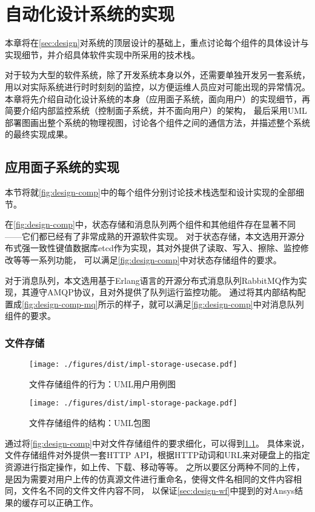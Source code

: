 \documentclass[index]{subfiles}
\begin{document}
\chapter{自动化设计系统的实现}\label{sec:impl}
本章将在\cref{sec:design}对系统的顶层设计的基础上，重点讨论每个组件的具体设计与实现细节，并介绍具体软件实现中所采用的技术栈。

对于较为大型的软件系统，除了开发系统本身以外，还需要单独开发另一套系统，用以对实际系统进行时时刻刻的监控，以方便运维人员应对可能出现的异常情况。
本章将先介绍自动化设计系统的本身（应用面子系统，面向用户）的实现细节，再简要介绍内部监控系统（控制面子系统，并不面向用户）的架构，
最后采用UML部署图画出整个系统的物理视图，讨论各个组件之间的通信方法，并描述整个系统的最终实现成果。

\section{应用面子系统的实现}
本节将就\cref{fig:design-comp}中的每个组件分别讨论技术栈选型和设计实现的全部细节。

在\cref{fig:design-comp}中，状态存储和消息队列两个组件和其他组件存在显著不同——它们都已经有了非常成熟的开源软件实现。
对于状态存储，本文选用开源分布式强一致性键值数据库etcd作为实现，其对外提供了读取、写入、擦除、监控修改等等一系列功能，
可以满足\cref{fig:design-comp}中对状态存储组件的要求。

对于消息队列，本文选用基于Erlang语言的开源分布式消息队列RabbitMQ作为实现，其遵守AMQP协议，且对外提供了队列运行监控功能。
通过将其内部结构配置成\cref{fig:design-comp-mq}所示的样子，就可以满足\cref{fig:design-comp}中对消息队列组件的要求。

\subsection{文件存储}
\begin{figure}[h]
  \centering
  \texttt{[image: ./figures/dist/impl-storage-usecase.pdf]}
  \caption{文件存储组件的行为：UML用户用例图\label{fig:impl-storage-usecase}}
\end{figure}
\begin{figure}[h]
  \centering
  \texttt{[image: ./figures/dist/impl-storage-package.pdf]}
  \caption{文件存储组件的结构：UML包图\label{fig:impl-storage-package}}
\end{figure}
通过将\cref{fig:design-comp}中对文件存储组件的要求细化，可以得到\cref{fig:impl-storage-usecase}。
具体来说，文件存储组件对外提供一套HTTP API，根据HTTP动词和URL来对硬盘上的指定资源进行指定操作，如上传、下载、移动等等。
之所以要区分两种不同的上传，是因为需要对用户上传的仿真源文件进行重命名，使得文件名相同的文件内容相同，文件名不同的文件文件内容不同，
以保证\cref{sec:design-wf}中提到的对Ansys结果的缓存可以正确工作。
\end{document}
